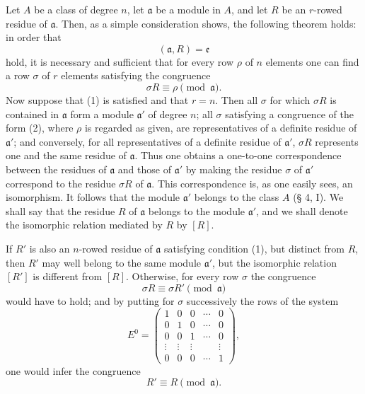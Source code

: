 \documentclass[11pt,a4paper]{article}
\begin{document}
Let $A$ be a class of degree $n$, let $\mathfrak a$ be a module in $A$, and let $R$ be an $r$-rowed residue of $\mathfrak a$. Then, as a simple consideration shows, the following theorem holds: in order that
\begin{equation}
 (\mathfrak a,R)=\mathfrak e
\tag{1}
\end{equation}
hold, it is necessary and sufficient that for every row $\rho$ of $n$ elements one can find a row $\sigma$ of $r$ elements satisfying the congruence
\begin{equation}
 \sigma R\equiv\rho\pmod{\mathfrak a}.
\tag{2}
\end{equation}
Now suppose that (1) is satisfied and that $r=n$. Then all $\sigma$ for which $\sigma R$ is contained in $\mathfrak a$ form a module $\mathfrak a'$ of degree $n$; all $\sigma$ satisfying a congruence of the form (2), where $\rho$ is regarded as given, are representatives of a definite residue of $\mathfrak a'$; and conversely, for all representatives of a definite residue of $\mathfrak a'$, $\sigma R$ represents one and the same residue of $\mathfrak a$. Thus one obtains a one-to-one correspondence between the residues of $\mathfrak a$ and those of $\mathfrak a'$ by making the residue $\sigma$ of $\mathfrak a'$ correspond to the residue $\sigma R$ of $\mathfrak a$. This correspondence is, as one easily sees, an isomorphism. It follows that the module $\mathfrak a'$ belongs to the class $A$ (§ 4, I). We shall say that the residue $R$ of $\mathfrak a$ belongs to the module $\mathfrak a'$, and we shall denote the isomorphic relation mediated by $R$ by $[R]$.

If $R'$ is also an $n$-rowed residue of $\mathfrak a$ satisfying condition (1), but distinct from $R$, then $R'$ may well belong to the same module $\mathfrak a'$, but the isomorphic relation $[R']$ is different from $[R]$. Otherwise, for every row $\sigma$ the congruence
\[
 \sigma R\equiv\sigma R'\pmod{\mathfrak a}
\]
would have to hold; and by putting for $\sigma$ successively the rows of the system
\[
 E^0=\begin{pmatrix}
 1&0&0&\cdots&0\\
 0&1&0&\cdots&0\\
 0&0&1&\cdots&0\\
 \vdots&\vdots&\vdots&&\vdots\\
 0&0&0&\cdots&1
 \end{pmatrix},
\]
one would infer the congruence
\[
 R'\equiv R\pmod{\mathfrak a}.
\]
\end{document}
